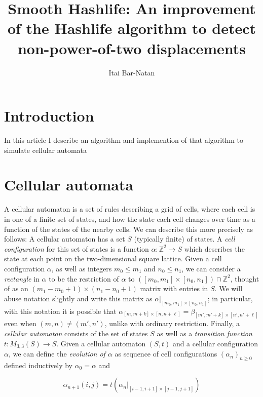 \documentclass{article}
\theoremstyle{definition}
\begin{document}
\title{Smooth Hashlife: An improvement of the Hashlife algorithm to detect
non-power-of-two displacements}
\author{Itai Bar-Natan}
\maketitle

\tableofcontents

\section{Introduction}

In this article I describe an algorithm and implemention of that algorithm to
simulate cellular automata

\section{Cellular automata}

A cellular automaton is a set of rules describing a grid of cells, where each
cell is in one of a finite set of states, and how the state each cell changes
over time as a function of the states of the nearby cells. We can describe this
more precisely as follows: A cellular automaton has a set $S$ (typically finite)
of states. A \emph {cell configuration} for this set of states is a function
$\alpha : \mathbb {Z}^2 \to S$ which describes the state at each point on the
two-dimensional square lattice. Given a cell configuration $\alpha$, as well as
integers $m_0 \leq m_1$ and $n_0 \leq n_1$, we can consider a \emph {rectangle}
in $\alpha$ to be the restriction of $\alpha$ to $([m_0, m_1] \times [n_0, n_1])
\cap \mathbb {Z}^2$, thought of as an $(m_1-m_0+1) \times (n_1-n_0+1)$ matrix
with entries in $S$. We will abuse notation slightly and write this matrix as
$\alpha |_{[m_0, m_1] \times [n_0, n_1]}$; in particular, with this notation it
is possible that $\alpha _{[m, m+k] \times [n, n+\ell]} = \beta _{[m', m'+k]
\times [n', n'+\ell]}$ even when $(m, n) \neq (m', n')$, unlike with ordinary
restriction. Finally, a \emph {cellular automaton} consists of the set of states
$S$ as well as a \emph {transition function} $t : M _{3, 3} (S) \to S$.  Given a
cellular automaton $(S, t)$ and a cellular configuration $\alpha$, we can define
the \emph {evolution of $\alpha$} as sequence of cell configurations $(\alpha_n)
_{n \geq 0}$ defined inductively by $\alpha_0 = \alpha$ and

$$ \alpha _{n+1} (i, j) = t (\alpha_n |_{[i-1, i+1] \times [j-1, j+1]}) $$
\end{document}
